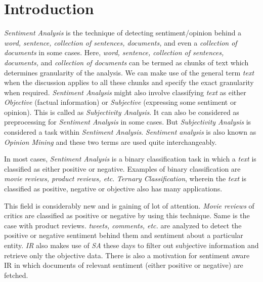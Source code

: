 
\chapter{Introduction} %

\label{Chapter1} %


\par 
\textit{Sentiment Analysis} is the technique of detecting sentiment/opinion behind a \textit{word, sentence, collection of sentences, documents,} 
and even a \textit{collection of documents} in some cases. Here, \textit{word, sentence, collection of sentences, documents,} and \textit{collection of 
documents} can be termed as chunks of text which determines granularity of the analysis. We can make use of the general term 
\emph{text} when the discussion applies to all these chunks and specify the exact granularity when required. \textit{Sentiment Analysis} 
might also involve classifying \emph{text} as either \emph{Objective} (factual information) or \emph{Subjective} (expressing some 
sentiment or opinion). This is called as \textit{Subjectivity Analysis}. It can also be considered as preprocessing for \textit{Sentiment Analysis} in some cases. 
But \textit{Subjectivity Analysis} is considered a task within \textit{Sentiment Analysis}. \textit{Sentiment analysis} is also known as \textit{Opinion 
Mining} and these two terms are used quite interchangeably.

\par

In most cases, \textit{Sentiment Analysis} is a binary classification task in which a \emph{text} is classified as either positive or negative.
Examples of binary classification are \textit{movie reviews, product reviews, etc}. \textit{Ternary Classification}, wherein the \emph{text} is classified
as positive, negative or objective also has many applications. 

\par

This field is considerably new and is gaining of lot of attention. \textit{Movie reviews} of critics are classified as positive or negative
by using this technique. Same is the case with product reviews. \textit{tweets, comments, etc.} are analyzed to detect the positive or negative
sentiment behind them and sentiment about a particular entity. \textit{IR} also makes use of \textit{SA} these days to filter out subjective information
and retrieve only the objective data. There is also a motivation for sentiment aware IR in which documents of relevant sentiment 
(either positive or negative) are fetched. 

